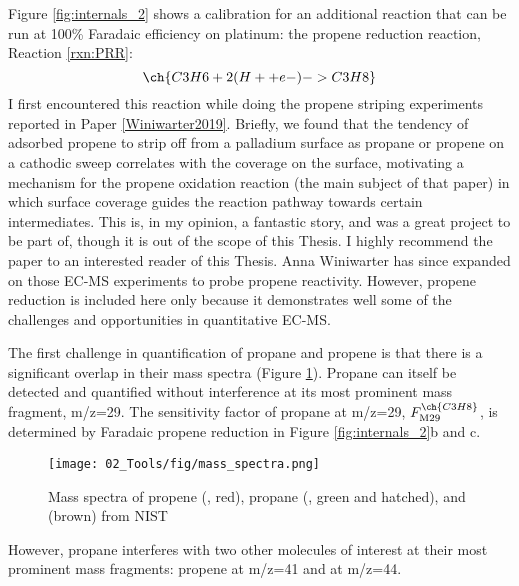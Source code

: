 Figure \ref{fig:internals_2} shows a calibration for an additional reaction that can be run at 100\% Faradaic efficiency on platinum: the propene reduction reaction, Reaction \ref{rxn:PRR}:
\begin{equation}
\ch{C3H6 + 2 (H+ + e- ) -> C3H8}\label{rxn:PRR}
\end{equation}
I first encountered this reaction while doing the propene striping experiments reported in Paper \ref{Winiwarter2019}. Briefly, we found that the tendency of adsorbed propene to strip off from a palladium surface as propane or propene on a cathodic sweep correlates with the coverage on the surface, motivating a mechanism for the propene oxidation reaction (the main subject of that paper) in which surface coverage guides the reaction pathway towards certain intermediates.  This is, in my opinion, a fantastic story, and was a great project to be part of, though it is out of the scope of this Thesis. I highly recommend the paper to an interested reader of this Thesis. Anna Winiwarter has since expanded on those EC-MS experiments to probe propene reactivity. However, propene reduction is included here only because it demonstrates well some of the challenges and opportunities in quantitative EC-MS.

The first challenge in quantification of propane and propene is that there is a significant overlap in their mass spectra (Figure \ref{fig:spectra}). Propane can itself be detected and quantified without interference at its most prominent mass fragment, m/z=29. The sensitivity factor of propane at m/z=29, $F_{\text{M29}}^{\ch{C3H8}}$, is determined by Faradaic propene reduction in Figure \ref{fig:internals_2}b and c. 
\begin{figure}[h!]
	\centering
	\texttt{[image: 02\_Tools/fig/mass\_spectra.png]}
	\caption{Mass spectra of propene (, red), propane (, green and hatched), and  (brown) from NIST\cite{NIST}
	}
	\label{fig:spectra}
\end{figure}
However, propane interferes with two other molecules of interest at their most prominent mass fragments: propene at m/z=41 and  at m/z=44.

